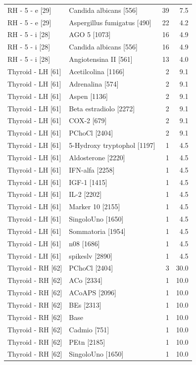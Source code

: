 \documentclass[a4paper,11pt]{article}
\begin{document}
\begin{footnotesize}
\begin{longtable}{p{3.5cm}p{7.5cm}rr}
RH - 5 - e [29] & Candida albicans [556] & 39 & 7.5 \\
RH - 5 - e [29] & Aspergillus fumigatus [490] & 22 & 4.2 \\
RH - 5 - i [28] & AGO 5 [1073] & 16 & 4.9 \\
RH - 5 - i [28] & Candida albicans [556] & 16 & 4.9 \\
RH - 5 - i [28] & Angiotensina II [561] & 13 & 4.0 \\
Thyroid - LH [61] & Acetilcolina [1166] & 2 & 9.1 \\
Thyroid - LH [61] & Adrenalina [574] & 2 & 9.1 \\
Thyroid - LH [61] & Aspen [1136] & 2 & 9.1 \\
Thyroid - LH [61] & Beta estradiolo [2272] & 2 & 9.1 \\
Thyroid - LH [61] & COX-2 [679] & 2 & 9.1 \\
Thyroid - LH [61] & PChoCl [2404] & 2 & 9.1 \\
Thyroid - LH [61] & 5-Hydroxy tryptophol [1197] & 1 & 4.5 \\
Thyroid - LH [61] & Aldosterone [2220] & 1 & 4.5 \\
Thyroid - LH [61] & IFN-alfa [2258] & 1 & 4.5 \\
Thyroid - LH [61] & IGF-1 [1415] & 1 & 4.5 \\
Thyroid - LH [61] & IL-2 [2202] & 1 & 4.5 \\
Thyroid - LH [61] & Marker 10 [2155] & 1 & 4.5 \\
Thyroid - LH [61] & SingoloUno [1650] & 1 & 4.5 \\
Thyroid - LH [61] & Sommatoria [1954] & 1 & 4.5 \\
Thyroid - LH [61] & n08 [1686] & 1 & 4.5 \\
Thyroid - LH [61] & spikeslv [2890] & 1 & 4.5 \\
Thyroid - RH [62] & PChoCl [2404] & 3 & 30.0 \\
Thyroid - RH [62] & ACo [2334] & 1 & 10.0 \\
Thyroid - RH [62] & ACoAPS [2096] & 1 & 10.0 \\
Thyroid - RH [62] & BEs [2313] & 1 & 10.0 \\
Thyroid - RH [62] & Base & 1 & 10.0 \\
Thyroid - RH [62] & Cadmio [751] & 1 & 10.0 \\
Thyroid - RH [62] & PEtn [2185] & 1 & 10.0 \\
Thyroid - RH [62] & SingoloUno [1650] & 1 & 10.0 \\
\end{longtable}
\end{footnotesize}
\end{document}

